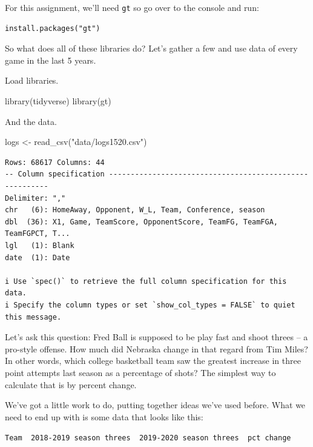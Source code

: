 \documentclass[
  letterpaper,
  DIV=11,
  numbers=noendperiod]{scrreprt}
\newenvironment{Shaded}{\begin{snugshade}}{\end{snugshade}}
\newcommand{\FunctionTok}[1]{\textcolor[rgb]{0.28,0.35,0.67}{#1}}
\newcommand{\NormalTok}[1]{\textcolor[rgb]{0.00,0.23,0.31}{#1}}
\newcommand{\OtherTok}[1]{\textcolor[rgb]{0.00,0.23,0.31}{#1}}
\newcommand{\StringTok}[1]{\textcolor[rgb]{0.13,0.47,0.30}{#1}}
\begin{document}
For this assignment, we'll need \texttt{gt} so go over to the console
and run:

\begin{verbatim}
install.packages("gt")
\end{verbatim}

So what does all of these libraries do? Let's gather a few and use data
of every game in the last 5 years.

Load libraries.

\begin{Shaded}
\begin{Highlighting}[]
\FunctionTok{library}\NormalTok{(tidyverse)}
\FunctionTok{library}\NormalTok{(gt)}
\end{Highlighting}
\end{Shaded}

And the data.

\begin{Shaded}
\begin{Highlighting}[]
\NormalTok{logs }\OtherTok{\textless{}{-}} \FunctionTok{read\_csv}\NormalTok{(}\StringTok{"data/logs1520.csv"}\NormalTok{)}
\end{Highlighting}
\end{Shaded}

\begin{verbatim}
Rows: 68617 Columns: 44
-- Column specification --------------------------------------------------------
Delimiter: ","
chr   (6): HomeAway, Opponent, W_L, Team, Conference, season
dbl  (36): X1, Game, TeamScore, OpponentScore, TeamFG, TeamFGA, TeamFGPCT, T...
lgl   (1): Blank
date  (1): Date

i Use `spec()` to retrieve the full column specification for this data.
i Specify the column types or set `show_col_types = FALSE` to quiet this message.
\end{verbatim}

Let's ask this question: Fred Ball is supposed to be play fast and shoot
threes -- a pro-style offense. How much did Nebraska change in that
regard from Tim Miles? In other words, which college basketball team saw
the greatest increase in three point attempts last season as a
percentage of shots? The simplest way to calculate that is by percent
change.

We've got a little work to do, putting together ideas we've used before.
What we need to end up with is some data that looks like this:

\texttt{Team\ \textbar{}\ 2018-2019\ season\ threes\ \textbar{}\ 2019-2020\ season\ threes\ \textbar{}\ pct\ change}
\end{document}
